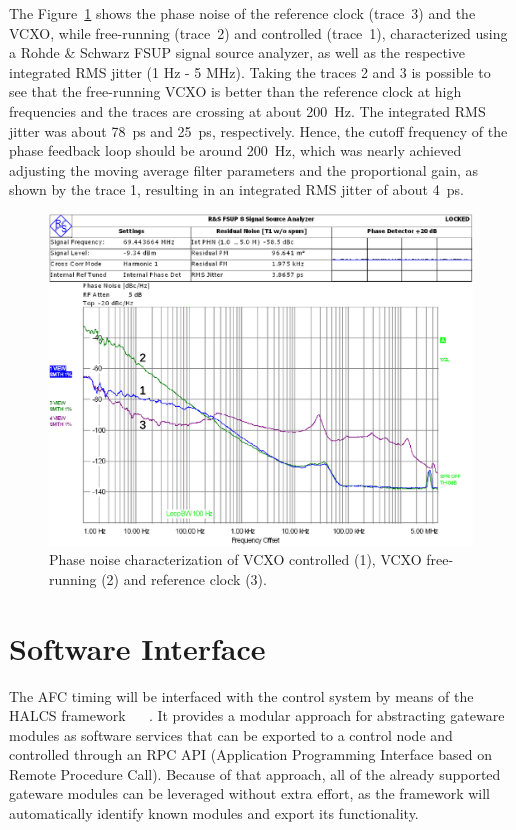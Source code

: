 \documentclass[a4paper,
               biblatex,      %
               ]{jacow}
\begin{document}
The Figure~\ref{fig:AFCPhaseNoise} shows the phase noise of the reference clock (trace~3) and the VCXO, while free-running (trace~2) and controlled (trace~1), characterized using a Rohde \& Schwarz FSUP signal source analyzer, as well as the respective integrated RMS jitter (1 Hz - 5 MHz). Taking the traces 2 and 3 is possible to see that the free-running VCXO is better than the reference clock at high frequencies and the traces are crossing at about 200~Hz. The integrated RMS jitter was about 78~ps and 25~ps, respectively. Hence, the cutoff frequency of the phase feedback loop should be around 200~Hz, which was nearly achieved adjusting the moving average filter parameters and the proportional gain, as shown by the trace 1, resulting in an integrated RMS jitter of about 4~ps.

\begin{figure}[!htb]
   \centering
   \includegraphics*[width=0.9\columnwidth]{Phase_noise}
   \caption{Phase noise characterization of VCXO controlled (1), VCXO free-running (2) and reference clock (3).}
   \label{fig:AFCPhaseNoise}
\end{figure}

\section{Software Interface}
The AFC timing will be interfaced with the control system by means of the HALCS framework ~\cite{halcs_pcapac16} ~\cite{halcs_icalepcs17}. It provides a modular approach for abstracting gateware modules as software services that can be exported to a control node and controlled through an RPC API (Application Programming Interface based on Remote Procedure Call). Because of that approach, all of the already supported gateware modules can be leveraged without extra effort, as the framework will automatically identify known modules and export its functionality.
\end{document}
